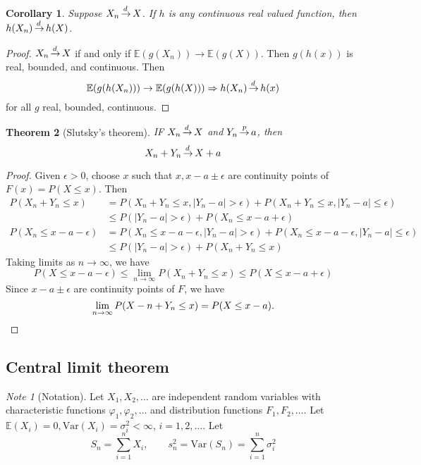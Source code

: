 \documentclass[10pt, oneside, reqno]{amsart}
\theoremstyle{plain}%
\newtheorem{thm}{Theorem}[section]
\newtheorem{cor}[thm]{Corollary}
\theoremstyle{definition}
\theoremstyle{remark}
\newtheorem*{note}{Note}
\newcommand{\var}{\text{Var}}
\renewcommand{\phi}{\varphi}
\newcommand{\E}{\mathbb{E}}
\def\cip{\,{\buildrel p \over \rightarrow}\,}
\def\cid{\,{\buildrel \!d \over \rightarrow}\,}
\begin{document}
\begin{cor}
	Suppose $X_n \cid X$.  If $h$ is any continuous real valued function, then $h(X_n) \cid h(X)$.
\end{cor}
\begin{proof}
	$X_n \cid X$ if and only if $\E(g(X_n)) \rightarrow \E(g(X))$.  Then $g(h(x))$ is real, bounded, and continuous.  Then \[
		\E(g(h(X_n))) \rightarrow \E(g(h(X))) \Rightarrow h(X_n) \cid h(x)
	\] for all $g$ real, bounded, continuous.
\end{proof}

\begin{thm}[Slutsky's theorem]
	IF $X_n \cid X$ and $Y_n \cip a$, then \[
		X_n + Y_n \cid X + a
	\]
\end{thm}
\begin{proof}
	Given $\epsilon > 0$, choose $x$ such that $x, x - a \pm \epsilon$ are continuity points of $F(x) = P(X \leq x)$.  Then \begin{align*}
		P(X_n + Y_n \leq x) &= P(X_n + Y_n \leq x, |Y_n - a | > \epsilon) + P(X_n + Y_n \leq x, |Y_n - a| \leq \epsilon) 		\\
		&\leq P(|Y_n - a | > \epsilon) + P(X_n \leq x - a + \epsilon) \\
		P(X_n \leq x - a - \epsilon) &= P(X_n \leq x - a - \epsilon, |Y_n - a| > \epsilon) + P(X_n \leq x - a - \epsilon, |Y_n - a | \leq \epsilon) \\
		&\leq P(|Y_n - a| > \epsilon) + P(X_n + Y_n \leq x)
	\end{align*}  Taking limits as $n \rightarrow \infty$, we have \[
		P(X \leq x - a - \epsilon) \leq \lim_{n \rightarrow \infty} P(X_n + Y_n \leq x) \leq P(X \leq x - a + \epsilon)  
	\]  Since $x - a \pm \epsilon$ are continuity points of $F$, we have \[
		\lim_{n \rightarrow \infty} P(X-n + Y_n \leq x) = P(X \leq x - a).\qedhere
	\]
\end{proof}
\subsection{Central limit theorem} %
\label{sub:central_limit_theorem}

\begin{note}[Notation]
	Let $X_1, X_2, \dots$ are independent random variables with characteristic functions $\phi_1, \phi_2, \dots$ and distribution functions $F_1, F_2, \dots$.  Let $\E(X_i) = 0, \var(X_i) = \sigma_i^2 < \infty$, $i = 1, 2, \dots$.  Let \[
		S_n = \sum_{i=1}^n X_i, \qquad s_n^2 = \var(S_n) = \sum_{i=1}^n \sigma_i^2
	\] 
\end{note}
\end{document}
